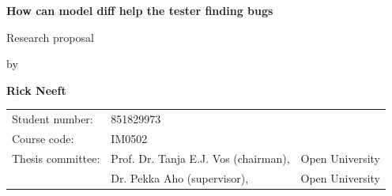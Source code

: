 \documentclass{ou-report-vaf}
\begin{document}

\pagestyle{plain}
\begin{titlepage}
\begin{center}


\vspace*{2\bigskipamount}

{\color{red}\Huge\bf How can model diff help the tester finding bugs}
\bigskip

{\large Research proposal}

\bigskip \bigskip
by
\bigskip \bigskip

{\Large\bf Rick Neeft}

\bigskip \bigskip\bigskip \bigskip

\begin{tabular}{lll}
    Student number: & 851829973 \\
    Course code: & \textsc{IM}0502\\
    Thesis committee:
        & Prof. Dr. Tanja E.J. Vos (chairman), & Open University \\
        & Dr. Pekka Aho (supervisor), & Open University
\end{tabular}

\end{center}
\end{titlepage}

\let\cleardoublepage\clearpage

\tableofcontents
\newpage
\end{document}
